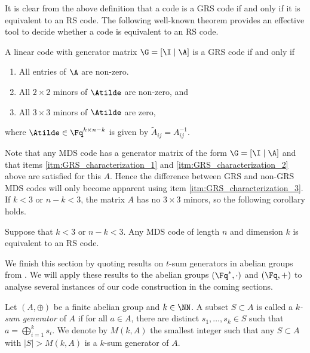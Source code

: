 \documentclass[conference,a4paper]{IEEEtran}
\begin{document}
It is clear from the above definition that a code is a GRS code if and only if it is equivalent to an RS code.
The following well-known theorem provides an effective tool to decide whether a code is equivalent to an RS code.

\begin{theorem}\label{thm:GRS_characterization}
A linear code with generator matrix $\G = [\I \mid \A]$ is a GRS code if and only if
\begin{enumerate}[label=(\roman*)]
\item\label{itm:GRS_characterization_1} All entries of $\A$ are non-zero.
\item\label{itm:GRS_characterization_2} All $2 \times 2$ minors of $\Atilde$ are non-zero, and
\item\label{itm:GRS_characterization_3} All $3 \times 3$ minors of $\Atilde$ are zero,
\end{enumerate}
where $\Atilde \in \Fq^{k \times n-k}$ is given by $\tilde{A}_{ij} = A_{ij}^{-1}$.
\end{theorem}

Note that any MDS code has a generator matrix of the form $\G = [\I \mid \A]$ and that items \ref{itm:GRS_characterization_1} and \ref{itm:GRS_characterization_2} above are satisfied for this $A$. Hence the difference between GRS and non-GRS MDS codes will only become apparent using item \ref{itm:GRS_characterization_3}. If $k<3$ or $n-k<3$, the matrix $A$ has no $3 \times 3$ minors, so the following corollary holds.
\begin{corollary}\label{cor:min_k_n-k_>_2}
Suppose that $k<3$ or $n-k<3$. Any MDS code of length $n$ and dimension $k$ is equivalent to an RS code.
\end{corollary}

We finish this section by quoting results on $t$-sum generators in abelian groups from \cite{roth_construction_1989, roth_t-sum_1992}. We will apply these results to the abelian groups $(\Fq^*,\cdot)$ and $(\Fq,+)$ to analyse several instances of our code construction in the coming sections.

\begin{definition}
Let $(A,\oplus)$ be a finite abelian group and $k \in \NN$. A subset $S \subset A$ is called a \emph{$k$-sum generator} of $A$ if for all $a \in A$, there are distinct $s_1,\dots,s_k \in S$ such that $a=\bigoplus_{i=1}^{k} s_i$. We denote by $M(k,A)$ the smallest integer such that any $S \subset A$ with $|S|>M(k,A)$ is a $k$-sum generator of $A$.
\end{definition}
\end{document}
